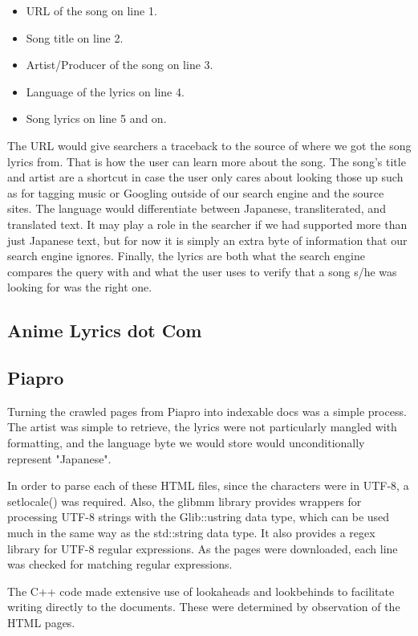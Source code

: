 \documentclass{acm} %
\begin{document}
\begin{CJK}{UTF8}{zhsong}
\begin{itemize}
\item URL of the song on line 1.
\item Song title on line 2.
\item Artist/Producer of the song on line 3.
\item Language of the lyrics on line 4.
\item Song lyrics on line 5 and on.
\end{itemize}

The URL would give searchers a traceback to the source of where we got the song lyrics from. That is how the user can learn more about the song. The song's title and artist are a shortcut in case the user only cares about looking those up such as for tagging music or Googling outside of our search engine and the source sites. The language would differentiate between Japanese, transliterated, and translated text. It may play a role in the searcher if we had supported more than just Japanese text, but for now it is simply an extra byte of information that our search engine ignores. Finally, the lyrics are both what the search engine compares the query with and what the user uses to verify that a song s/he was looking for was the right one.

\subsection{Anime Lyrics dot Com}

\subsection{Piapro}

Turning the crawled pages from Piapro into indexable docs was a simple process. The artist was simple to retrieve, the lyrics were not particularly mangled with formatting, and the language byte we would store would unconditionally represent "Japanese".

In order to parse each of these HTML files, since the characters were in UTF-8, a setlocale() was required. Also, the glibmm library provides wrappers for processing UTF-8 strings with the Glib::ustring data type, which can be used much in the same way as the std::string data type. It also provides a regex library for UTF-8 regular expressions. As the pages were downloaded, each line was checked for matching regular expressions.

The C++ code made extensive use of lookaheads and lookbehinds to facilitate writing directly to the documents. These were determined by observation of the HTML pages.


\end{CJK}
\end{document}
